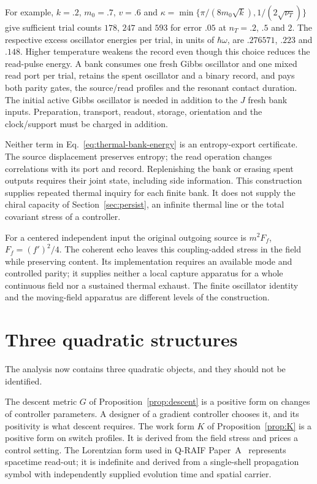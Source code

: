 \documentclass[aps,pre,onecolumn,superscriptaddress,floatfix,longbibliography]{revtex4-2}
\begin{document}
For example, $k=.2$, $m_0=.7$, $v=.6$ and
$\kappa=\min\{\pi/(8m_0\sqrt{k}),1/(2\sqrt{\nu_T})\}$ give sufficient
trial counts $178$, $247$ and $593$ for error $.05$ at
$n_T=.2$, $.5$ and $2$. The respective excess oscillator energies per
trial, in units of $\hbar\omega$, are $.276571$, $.223$ and $.148$.
Higher temperature weakens the record even though this choice reduces
the read-pulse energy. A bank consumes one fresh Gibbs oscillator and one
mixed read port per trial, retains the spent oscillator and a binary
record, and pays both parity gates, the source/read profiles and the
resonant contact duration. The initial active Gibbs oscillator is needed
in addition to the $J$ fresh bank inputs. Preparation, transport, readout, storage,
orientation and the clock/support must be charged in addition.

Neither term in Eq.~\eqref{eq:thermal-bank-energy} is an entropy-export
certificate. The source displacement preserves entropy; the read operation
changes correlations with its port and record. Replenishing the bank or
erasing spent outputs requires their joint state, including side information.
This construction supplies repeated thermal inquiry for each finite bank.
It does not supply the chiral capacity of Section~\ref{sec:persist}, an
infinite thermal line or the total covariant stress of a controller.

For a centered independent input the original outgoing source is $m^2F_f$,
$F_f=(f')^2/4$. The coherent echo leaves this coupling-added stress in the field
while preserving content. Its implementation requires an available mode and
controlled parity; it supplies neither a local capture apparatus for a whole
continuous field nor a sustained thermal exhaust. The finite oscillator identity
and the moving-field apparatus are different levels of the construction.

\section{Three quadratic structures}
\label{sec:forms}

The analysis now contains three quadratic objects, and they should not be identified.

The descent metric $G$ of Proposition~\ref{prop:descent} is a positive form on changes of controller parameters. A designer of a gradient controller chooses it, and its positivity is what descent requires. The work form $K$ of Proposition~\ref{prop:K} is a positive form on switch profiles. It is derived from the field stress and prices a control setting. The Lorentzian form used in Q-RAIF Paper~A~\cite{Liu2026QRAIF_A} represents spacetime read-out; it is indefinite and derived from a single-shell propagation symbol with independently supplied evolution time and spatial carrier.
\end{document}
